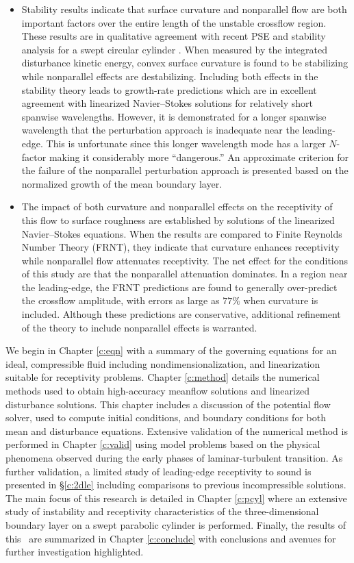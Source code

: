 \begin{itemize}
\item Stability results indicate that surface curvature and nonparallel flow
are both important factors over the entire length of the unstable crossflow
region.  These results are in qualitative agreement with recent PSE and
stability analysis for a swept circular cylinder \cite{MaMa:94,MaBa:93}.  When
measured by the integrated disturbance kinetic energy, convex surface
curvature is found to be stabilizing while nonparallel effects are
destabilizing.  Including both effects in the stability theory leads to
growth-rate predictions which are in excellent agreement with linearized
Navier--Stokes solutions for relatively short spanwise wavelengths.  However,
it is demonstrated for a longer spanwise wavelength that the perturbation
approach is inadequate near the leading-edge.  This is unfortunate since this
longer wavelength mode has a larger $N$-factor making it considerably more
``dangerous.''  An approximate criterion for the failure of the nonparallel
perturbation approach is presented based on the normalized growth of the mean
boundary layer.

\item The impact of both curvature and nonparallel effects on the receptivity
of this flow to surface roughness are established by solutions of the
linearized Navier--Stokes equations.  When the results are compared to Finite
Reynolds Number Theory (FRNT), they indicate that curvature enhances
receptivity while nonparallel flow attenuates receptivity.  The net effect for
the conditions of this study are that the nonparallel attenuation dominates.
In a region near the leading-edge, the FRNT predictions are found to generally
over-predict the crossflow amplitude, with errors as large as $77\%$ when
curvature is included.  Although these predictions are conservative,
additional refinement of the theory to include nonparallel effects is
warranted.

\end{itemize}

We begin in Chapter \ref{c:eqn} with a summary of the governing equations for
an ideal, compressible fluid including nondimensionalization, and
linearization suitable for receptivity problems.  Chapter \ref{c:method}
details the numerical methods used to obtain high-accuracy meanflow solutions
and linearized disturbance solutions.  This chapter includes a discussion of
the potential flow solver, used to compute initial conditions, and boundary
conditions for both mean and disturbance equations.  Extensive validation of
the numerical method is performed in Chapter \ref{c:valid} using model
problems based on the physical phenomena observed during the early phases of
laminar-turbulent transition.  As further validation, a limited study of
leading-edge receptivity to sound is presented in \S\ref{c:2dle} including
comparisons to previous incompressible solutions.  The main focus of this
research is detailed in Chapter \ref{c:pcyl} where an extensive study of
instability and receptivity characteristics of the three-dimensional boundary
layer on a swept parabolic cylinder is performed.  Finally, the results of
this \thesis\ are summarized in Chapter \ref{c:conclude} with conclusions and
avenues for further investigation highlighted.

